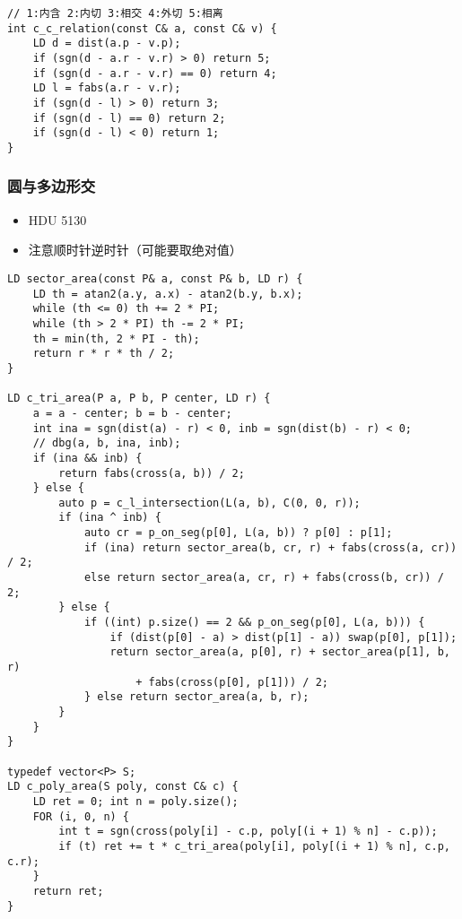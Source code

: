 \documentclass[]{article}
\providecommand{\tightlist}{%
  \setlength{\itemsep}{0pt}\setlength{\parskip}{0pt}}
\begin{document}
\begin{verbatim}
// 1:内含 2:内切 3:相交 4:外切 5:相离
int c_c_relation(const C& a, const C& v) {
    LD d = dist(a.p - v.p);
    if (sgn(d - a.r - v.r) > 0) return 5;
    if (sgn(d - a.r - v.r) == 0) return 4;
    LD l = fabs(a.r - v.r);
    if (sgn(d - l) > 0) return 3;
    if (sgn(d - l) == 0) return 2;
    if (sgn(d - l) < 0) return 1;
}
\end{verbatim}

\hypertarget{ux5706ux4e0eux591aux8fb9ux5f62ux4ea4}{%
\subsubsection{圆与多边形交}\label{ux5706ux4e0eux591aux8fb9ux5f62ux4ea4}}

\begin{itemize}
\tightlist
\item
  HDU 5130
\item
  注意顺时针逆时针（可能要取绝对值）
\end{itemize}

\begin{verbatim}
LD sector_area(const P& a, const P& b, LD r) {
    LD th = atan2(a.y, a.x) - atan2(b.y, b.x);
    while (th <= 0) th += 2 * PI;
    while (th > 2 * PI) th -= 2 * PI;
    th = min(th, 2 * PI - th);
    return r * r * th / 2;
}

LD c_tri_area(P a, P b, P center, LD r) {
    a = a - center; b = b - center;
    int ina = sgn(dist(a) - r) < 0, inb = sgn(dist(b) - r) < 0;
    // dbg(a, b, ina, inb);
    if (ina && inb) {
        return fabs(cross(a, b)) / 2;
    } else {
        auto p = c_l_intersection(L(a, b), C(0, 0, r));
        if (ina ^ inb) {
            auto cr = p_on_seg(p[0], L(a, b)) ? p[0] : p[1];
            if (ina) return sector_area(b, cr, r) + fabs(cross(a, cr)) / 2;
            else return sector_area(a, cr, r) + fabs(cross(b, cr)) / 2;
        } else {
            if ((int) p.size() == 2 && p_on_seg(p[0], L(a, b))) {
                if (dist(p[0] - a) > dist(p[1] - a)) swap(p[0], p[1]);
                return sector_area(a, p[0], r) + sector_area(p[1], b, r)
                    + fabs(cross(p[0], p[1])) / 2;
            } else return sector_area(a, b, r);
        }
    }
}

typedef vector<P> S;
LD c_poly_area(S poly, const C& c) {
    LD ret = 0; int n = poly.size();
    FOR (i, 0, n) {
        int t = sgn(cross(poly[i] - c.p, poly[(i + 1) % n] - c.p));
        if (t) ret += t * c_tri_area(poly[i], poly[(i + 1) % n], c.p, c.r);
    }
    return ret;
}
\end{verbatim}
\end{document}
